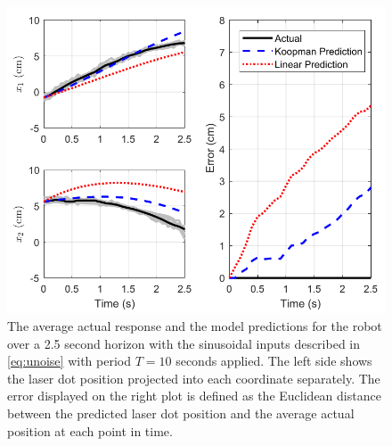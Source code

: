\begin{figure}
    \centering
    \includegraphics[width=\linewidth]{figures/predictionComparison_v3.pdf}
    \caption{The average actual response and the model predictions for the robot over a 2.5 second horizon with the sinusoidal inputs described in \eqref{eq:unoise} with period $T = 10$ seconds applied. The left side shows the laser dot position projected into each coordinate separately. The error displayed on the right plot is defined as the Euclidean distance between the predicted laser dot position and the average actual position at each point in time. }
    \label{fig:predict}
\end{figure}

